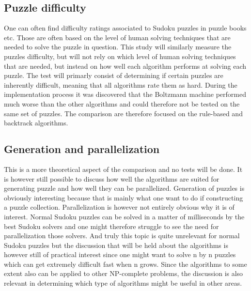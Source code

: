 \documentclass[a4paper,11pt]{kth-mag}
\begin{document}
\FloatBarrier
\subsection{Puzzle difficulty}
One can often find difficulty ratings associated to Sudoku puzzles in puzzle books etc. 
Those are often based on the level of human solving techniques that are needed to solve the puzzle in question. \cite{difficulty} 
This study will similarly measure the puzzles difficulty, but will not rely on which level of human solving techniques that are needed, but instead on how well each algorithm performs at solving each puzzle. 
The test will primarly consist of determining if certain puzzles are inherently difficult, meaning that all algorithms rate them as hard.
During the implementation process it was discovered that the Boltzmann machine performed much worse than the other algorithms and could therefore not be tested on the same set of puzzles.
The comparison are therefore focused on the rule-based and backtrack algorithms.

\FloatBarrier
\subsection{Generation and parallelization}
This is a more theoretical aspect of the comparison and no tests will be done.
It is however still possible to discuss how well the algorithms are suited for generating puzzle and how well they can be parallelized. 
Generation of puzzles is obviously interesting because that is mainly what one want to do if constructing a puzzle collection. 
Parallelization is however not entirely obvious why it is of interest. 
Normal Sudoku puzzles can be solved in a matter of milliseconds by the best Sudoku solvers and one might therefore struggle to see the need for parallelization those solvers. 
And truly this topic is quite unrelevant for normal Sudoku puzzles but the discussion that will be held about the algorithms is however still of practical interest since one might want to solve n by n puzzles which can get extremely difficult fast when n grows. 
Since the algorithms to some extent also can be applied to other NP-complete problems, the discussion is also relevant in determining which type of algorithms might be useful in other areas. 

\FloatBarrier
\end{document}
